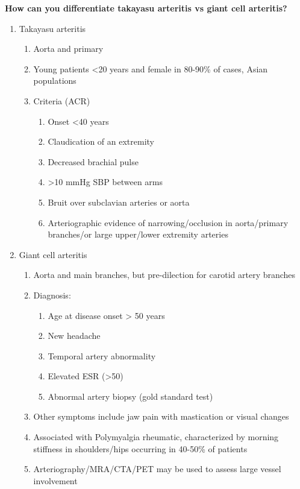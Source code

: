 \documentclass[
]{book}
\begin{document}
\textbf{How can you differentiate takayasu arteritis vs giant cell
arteritis?}

\begin{enumerate}
\def\labelenumi{\arabic{enumi}.}
\item
  Takayasu arteritis

  \begin{enumerate}
  \def\labelenumii{\arabic{enumii}.}
  \item
    Aorta and primary
  \item
    Young patients \textless20 years and female in 80-90\% of cases, Asian
    populations
  \item
    Criteria (ACR)

    \begin{enumerate}
    \def\labelenumiii{\arabic{enumiii}.}
    \item
      Onset \textless40 years
    \item
      Claudication of an extremity~
    \item
      Decreased brachial pulse~
    \item
      \textgreater10 mmHg SBP between arms
    \item
      Bruit over subclavian arteries or aorta
    \item
      Arteriographic evidence of narrowing/occlusion in
      aorta/primary branches/or large upper/lower extremity
      arteries
    \end{enumerate}
  \end{enumerate}
\item
  Giant cell arteritis~

  \begin{enumerate}
  \def\labelenumii{\arabic{enumii}.}
  \item
    Aorta and main branches, but pre-dilection for carotid artery
    branches
  \item
    Diagnosis:~

    \begin{enumerate}
    \def\labelenumiii{\arabic{enumiii}.}
    \item
      Age at disease onset \textgreater{} 50 years~
    \item
      New headache
    \item
      Temporal artery abnormality~
    \item
      Elevated ESR (\textgreater50)~
    \item
      Abnormal artery biopsy (gold standard test)
    \end{enumerate}
  \item
    Other symptoms include jaw pain with mastication or visual
    changes
  \item
    Associated with Polymyalgia rheumatic, characterized by morning
    stiffness in shoulders/hips occurring in 40-50\% of patients~
  \item
    Arteriography/MRA/CTA/PET may be used to assess large vessel
    involvement
  \end{enumerate}
\end{enumerate}
\end{document}
